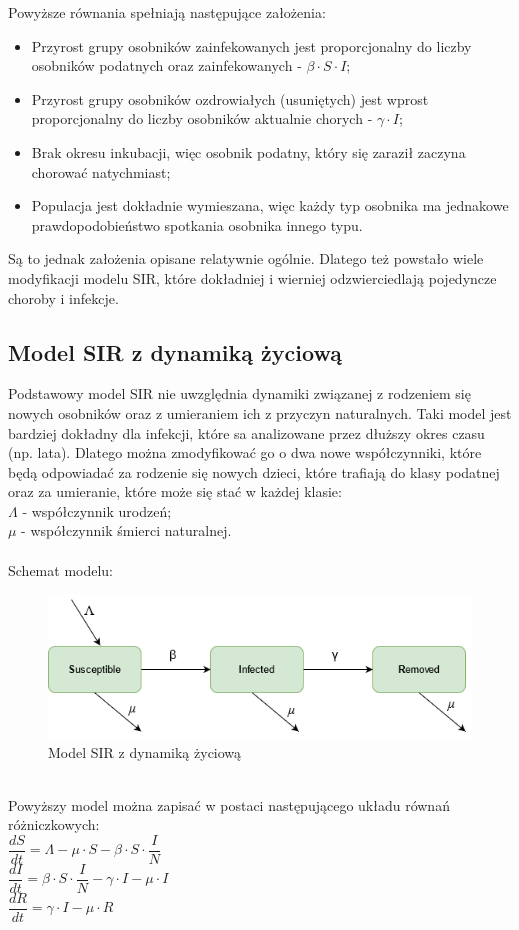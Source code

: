 \documentclass[12pt,a4paper]{article}
\begin{document}
Powyższe równania spełniają następujące założenia:
\begin{itemize}
\item Przyrost grupy osobników zainfekowanych jest proporcjonalny do liczby osobników podatnych oraz zainfekowanych - $\beta\cdot{S}\cdot{I}$;
\item Przyrost grupy osobników ozdrowiałych (usuniętych) jest wprost proporcjonalny do liczby osobników aktualnie chorych - $\gamma\cdot{I}$;
\item Brak okresu inkubacji, więc osobnik podatny, który się zaraził zaczyna chorować natychmiast;
\item Populacja jest dokładnie wymieszana, więc każdy typ osobnika ma jednakowe prawdopodobieństwo spotkania osobnika innego typu.
\end{itemize}

Są to jednak założenia opisane relatywnie ogólnie. Dlatego też powstało wiele modyfikacji modelu SIR, które dokładniej i wierniej odzwierciedlają pojedyncze choroby i infekcje. 

\subsection{Model SIR z dynamiką życiową}
Podstawowy model SIR nie uwzględnia dynamiki związanej z rodzeniem się nowych osobników oraz z umieraniem ich z przyczyn naturalnych. Taki model jest bardziej dokładny dla infekcji, które sa analizowane przez dłuższy okres czasu (np. lata). Dlatego można zmodyfikować go o dwa nowe współczynniki, które będą odpowiadać za rodzenie się nowych dzieci, które trafiają do klasy podatnej oraz za umieranie, które może się stać w każdej klasie:\\
\textit{$\Lambda$} - współczynnik urodzeń;\\
\textit{$\mu$} - współczynnik śmierci naturalnej.\\\\
Schemat modelu:
\begin{figure}[h!]
\centering
\includegraphics[width=1.0\textwidth]{Schematy/SIR_Vital}
\caption{Model SIR z dynamiką życiową} 
\label{fig:Model SIR z dynamiką życiową}
\end{figure}\\
Powyższy model można zapisać w postaci następującego układu równań różniczkowych:\\
$\dfrac{dS}{dt} = \Lambda - \mu\cdot{S} -\beta\cdot{S}\cdot\dfrac{I}{N}$\\
$\dfrac{dI}{dt} = \beta\cdot{S}\cdot\dfrac{I}{N} - \gamma\cdot{I} - \mu\cdot{I}$\\
$\dfrac{dR}{dt} = \gamma\cdot{I} - \mu\cdot{R}$\\
\end{document}
